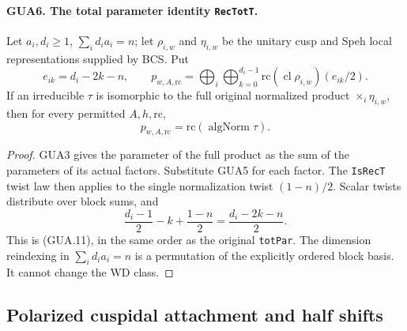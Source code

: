 \paragraph{GUA6. The total parameter identity \texttt{RecTotT}.}
\label{claim:GUA6}
Let $a_i,d_i\geq1$, $\sum_i d_i a_i=n$; let
$\rho_{i,w}$ and $\eta_{i,w}$ be the unitary cusp and
Speh local representations supplied by BCS.  Put
\[
 e_{ik}=d_i-2k-n,\qquad
 p_{w,A,\mathrm{rc}}
   =\bigoplus_i\bigoplus_{k=0}^{d_i-1}
                 \mathrm{rc}(\operatorname{cl}\rho_{i,w})(e_{ik}/2).
                                                        \tag{GUA.11}
\]
If an irreducible $\tau$ is isomorphic to the full original
normalized product $\mathop{\times}_i\eta_{i,w}$, then
for every permitted $A,h,\mathrm{rc}$,
\[
                  p_{w,A,\mathrm{rc}}
                       =\mathrm{rc}(\operatorname{algNorm}\tau).
                                                        \tag{GUA.12}
\]
\begin{proof}
GUA3 gives the parameter of the full product as the sum
of the parameters of its actual factors.  Substitute
GUA5 for each factor.  The \texttt{IsRecT} twist law
then applies to the single normalization twist
$(1-n)/2$.  Scalar twists distribute over block sums,
and
\[
        \frac{d_i-1}{2}-k+\frac{1-n}{2}
                              =\frac{d_i-2k-n}{2}.
\]
This is (GUA.11), in the same order as the original
\texttt{totPar}.  The dimension reindexing in
$\sum_i d_i a_i=n$ is a permutation of the explicitly
ordered block basis.  It cannot change the WD class.
\end{proof}

\subsection{Polarized cuspidal attachment and half shifts}

